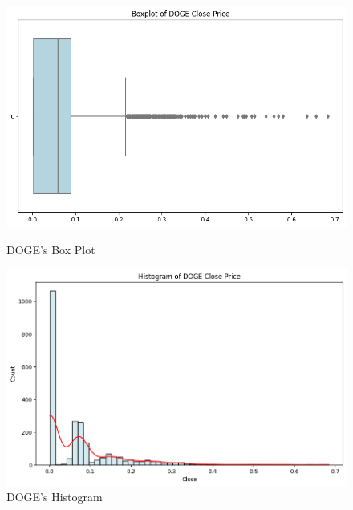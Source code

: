 \documentclass{ieeeojies}
\begin{document}
\begin{figure}[H]
    \centering
    \begin{minipage}{0.23\textwidth}
        \centering
        \includegraphics[width=\linewidth]{graph/doge_boxplot.png}
        \caption{DOGE's Box Plot}
        \label{fig:1}
    \end{minipage}
    \hfill
    \begin{minipage}{0.23\textwidth}
        \centering
        \includegraphics[width=\linewidth]{graph/doge_his.png}
        \caption{DOGE's Histogram}
        \label{fig:2}
    \end{minipage}
\end{figure}
\end{document}
